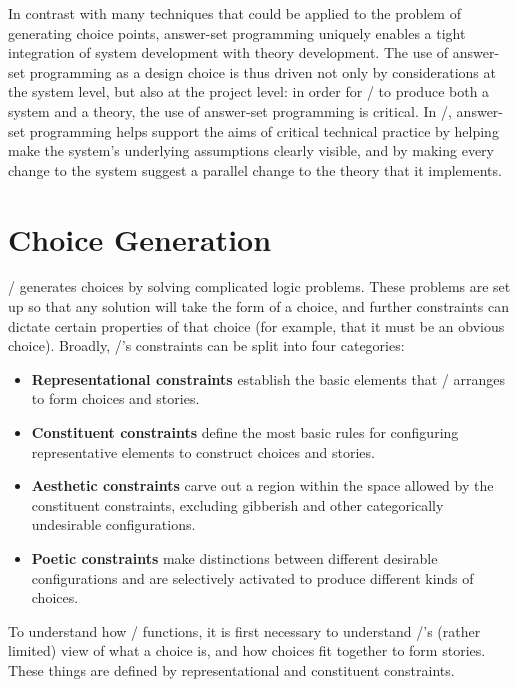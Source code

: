 In contrast with many techniques that could be applied to the problem of generating choice points, answer-set programming uniquely enables a tight integration of system development with theory development.
%
The use of answer-set programming as a design choice is thus driven not only by considerations at the system level, but also at the project level: in order for \dunyazad/ to produce both a system and a theory, the use of answer-set programming is critical.
%
In \dunyazad/, answer-set programming helps support the aims of critical technical practice by helping make the system's underlying assumptions clearly visible, and by making every change to the system suggest a parallel change to the theory that it implements.


\section{Choice Generation}
\label{sec:dunyazad-choice-generation}%

\dunyazad/ generates choices by solving complicated logic problems.
%
These problems are set up so that any solution will take the form of a choice, and further constraints can dictate certain properties of that choice (for example, that it must be an obvious choice).
%
Broadly, \dunyazad/'s constraints can be split into four categories:

\begin{itemize}
\item \textbf{Representational constraints} establish the basic elements that \dunyazad/ arranges to form choices and stories.
\item \textbf{Constituent constraints} define the most basic rules for configuring representative elements to construct choices and stories.
\item \textbf{Aesthetic constraints} carve out a region within the space allowed by the constituent constraints, excluding gibberish and other categorically undesirable configurations.
\item \textbf{Poetic constraints} make distinctions between different desirable configurations and are selectively activated to produce different kinds of choices.
\end{itemize}

To understand how \dunyazad/ functions, it is first necessary to understand \dunyazad/'s (rather limited) view of what a choice is, and how choices fit together to form stories.
%
These things are defined by representational and constituent constraints.


